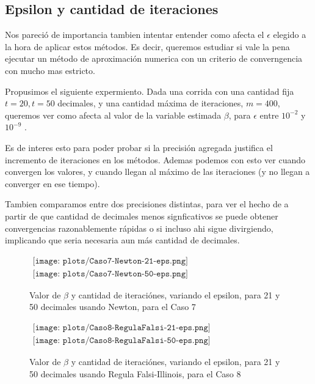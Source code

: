 

\subsection{Epsilon y cantidad de iteraciones}

\indent Nos pareci\'o de importancia tambien intentar entender como afecta
el $\epsilon$ elegido a la hora de aplicar estos m\'etodos. Es decir,
queremos estudiar si vale la pena ejecutar un m\'etodo de aproximaci\'on numerica
con un criterio de converngencia con mucho mas estricto.

Propusimos el siguiente expermiento. Dada una corrida con una cantidad fija $t=20, t=50$ decimales,
y una cantidad m\'axima de iteraciones, $m=400$, queremos ver como afecta al valor
de la variable estimada $\beta$, para $\epsilon$ entre $10^{-2}$ y $10^{-9}$ .

Es de interes esto para poder probar si la precisi\'on agregada justifica el incremento
de iteraciones en los m\'etodos. Ademas podemos con esto ver cuando convergen los valores, y
cuando llegan al m\'aximo de las iteraciones (y no llegan a converger en ese tiempo).

Tambien comparamos entre dos precisiones distintas, para ver el hecho de a partir de que 
cantidad de decimales menos signficativos se puede obtener convergencias razonablemente 
r\'apidas o si incluso ahi sigue divirgiendo, implicando que seria necesaria aun m\'as cantidad
de decimales.



\begin{figure}
$\begin{array}{c}
\texttt{[image: plots/Caso7-Newton-21-eps.png]} \\
\texttt{[image: plots/Caso7-Newton-50-eps.png]}
\end{array}$
\label{fig:Newton-Eps-Caso4}
\caption{Valor de $\beta$ y cantidad de iteraci\'ones, variando el epsilon, para 21 y 50 
decimales usando Newton, para el Caso 7}
\end{figure}


\begin{figure}
$\begin{array}{c}
\texttt{[image: plots/Caso8-RegulaFalsi-21-eps.png]} \\
\texttt{[image: plots/Caso8-RegulaFalsi-50-eps.png]}
\end{array}$
\label{fig:RegulaFalsi-Eps-Caso4}
\caption{Valor de $\beta$ y cantidad de iteraci\'ones, variando el epsilon, para 21 y 50 
decimales usando Regula Falsi-Illinois, para el Caso 8}
\end{figure}


